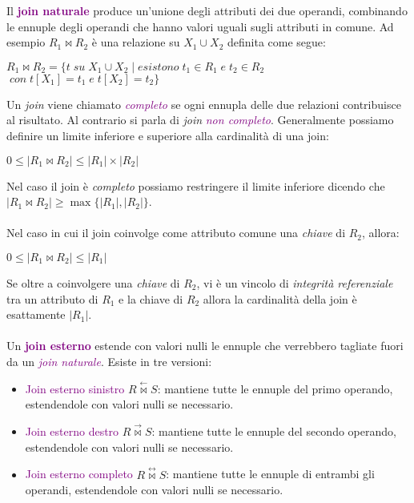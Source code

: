 Il \textbf{\textcolor{purple}{join naturale}} produce un'unione degli attributi dei due operandi, combinando le ennuple
degli operandi che hanno valori uguali sugli attributi in comune. Ad esempio $R_1 \bowtie R_2$ è una relazione su $X_1 \cup X_2$ definita come segue:
\begin{center}
    $R_1 \bowtie R_2 = \{t \;su\; X_1 \cup X_2 \;|\; esistono \;t_1 \in R_1 \;e\; t_2 \in R_2 $ \\
    $\;con\; t[X_1] = t_1 \;e\; t[X_2] = t_2\}$
\end{center}

Un \emph{join} viene chiamato \emph{\textcolor{purple}{completo}} se ogni ennupla delle due relazioni
contribuisce al risultato. Al contrario si parla di \emph{join} \emph{\textcolor{purple}{non completo}}.
Generalmente possiamo definire un limite inferiore e superiore alla cardinalità di una join:
\begin{center}
    $0 \leq |R_1 \bowtie R_2| \leq |R_1| \times |R_2|$
\end{center}
Nel caso il join è \emph{completo} possiamo restringere il limite inferiore
dicendo che $|R_1 \bowtie R_2| \geq \max\{|R_1|, |R_2|\}$.
\\\\
Nel caso in cui il join coinvolge come attributo comune una \emph{chiave} di $R_2$, allora:
\begin{center}
    $0 \leq |R_1 \bowtie R_2| \leq |R_1|$
\end{center}

Se oltre a coinvolgere una \emph{chiave} di $R_2$, vi è un vincolo di \emph{integrità referenziale} tra un
attributo di $R_1$ e la chiave di $R_2$ allora la cardinalità della join è esattamente $|R_1|$.
\\\\
Un \textbf{\textcolor{purple}{join esterno}} estende con valori nulli le ennuple che verrebbero
tagliate fuori da un \emph{\textcolor{purple}{join naturale}}.
Esiste in tre versioni:
\begin{itemize}
    \item \textcolor{purple}{Join esterno sinistro} $R \overset{\leftarrow}{\bowtie} S$: mantiene tutte le ennuple del primo
        operando, estendendole con valori nulli se necessario.
    \item \textcolor{purple}{Join esterno destro} $R \overset{\rightarrow}{\bowtie} S$: mantiene tutte le ennuple del secondo
    operando, estendendole con valori nulli se necessario.
    \item \textcolor{purple}{Join esterno completo} $R \overset{\leftrightarrow}{\bowtie} S$: mantiene tutte le ennuple di entrambi
        gli operandi, estendendole con valori nulli se necessario.
\end{itemize}

